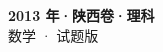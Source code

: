 \documentclass[zihao=-4, a4paper]{ctexart}
\begin{document}
\begin{center}
  {\Large\bfseries 2013 年·陕西卷·理科}\\[4pt]
  {\large 数学 · 试题版}
\end{center}
\medskip
{}

\end{document}
